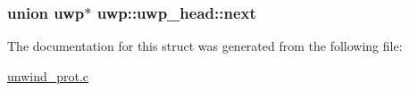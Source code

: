 \subsubsection[{\texorpdfstring{next}{next}}]{\setlength{\rightskip}{0pt plus 5cm}union {\bf uwp}$\ast$ uwp\+::uwp\+\_\+head\+::next}\hypertarget{structuwp_1_1uwp__head_ac52194b98a40d4432fcb9fcb0b7f385a}{}\label{structuwp_1_1uwp__head_ac52194b98a40d4432fcb9fcb0b7f385a}


The documentation for this struct was generated from the following file\+:\begin{DoxyCompactItemize}
\item 
\hyperlink{unwind__prot_8c}{unwind\+\_\+prot.\+c}\end{DoxyCompactItemize}

